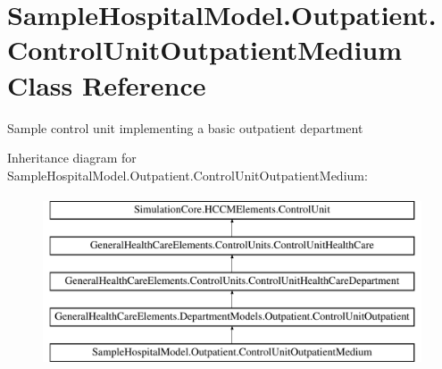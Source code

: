 \hypertarget{class_sample_hospital_model_1_1_outpatient_1_1_control_unit_outpatient_medium}{}\section{Sample\+Hospital\+Model.\+Outpatient.\+Control\+Unit\+Outpatient\+Medium Class Reference}
\label{class_sample_hospital_model_1_1_outpatient_1_1_control_unit_outpatient_medium}


Sample control unit implementing a basic outpatient department  


Inheritance diagram for Sample\+Hospital\+Model.\+Outpatient.\+Control\+Unit\+Outpatient\+Medium\+:\begin{figure}[H]
\begin{center}
\leavevmode
\includegraphics[height=5.000000cm]{class_sample_hospital_model_1_1_outpatient_1_1_control_unit_outpatient_medium}
\end{center}
\end{figure}
